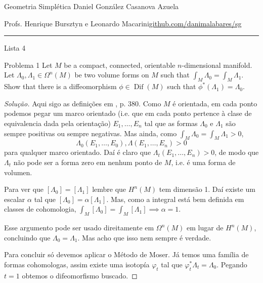 
\usepackage[style=authortitle-terse,backend=bibtex]{biblatex}




\begin{minipage}{\textwidth}
	\begin{minipage}{1\textwidth}
		Geometria Simpl\'etica \hfill Daniel González Casanova Azuela
		
		{\small Profs. Henrique Bursztyn e Leonardo Macarini\hfill\href{https://github.com/danimalabares/sg}{github.com/danimalabares/sg}}
	\end{minipage}
\end{minipage}\vspace{.2cm}\hrule

\vspace{10pt}
{\huge Lista 4}

\tableofcontents

\begin{idea4}{Problema 1}\leavevmode
Let $M$ be a compact, connected, orientable $n$-dimensional manifold. Let $\Lambda_0,\Lambda_1\in\Omega^{n}(M)$ be two volume forms on $M$ such that $\int_{M}\Lambda_0=\int_{M}\Lambda_1$. Show that there is a diffeomorphism $\phi \in \operatorname{Dif}(M)$ such that $\phi^*\left( \Lambda_1 \right) =\Lambda_0$.
\end{idea4}

\begin{proof}[Solução]
Aqui sigo as definições em \cite{lee}, p. 380.  Como $M$ é orientada, em cada ponto podemos pegar um marco orientado (i.e. que em cada ponto pertence à clase de equivalencia dada pela orientação) $E_1,\ldots,E_n$ tal que as formas $\Lambda_0$ e $\Lambda_1$ são sempre positivas ou sempre negativas. Mas ainda, como $\int_{M}\Lambda_0=\int_{M}\Lambda_1>0$,
\[\Lambda_0(E_1,\ldots,E_0),\Lambda(E_1,\ldots,E_n)>0\]
para qualquer marco orientado. Daí é claro que $\Lambda_t(E_1,\ldots,E_n)>0$, de modo que $\Lambda_t$ não pode ser a forma zero em nenhum ponto de $M$, i.e. é uma forma de volumen.

	Para ver que $\left[ \Lambda_0 \right] =\left[ \Lambda_1 \right] $ lembre que $H^{n}(M)$ tem dimensão 1. Daí existe um escalar $\alpha$ tal que $\left[ \Lambda_0 \right] =\alpha \left[ \Lambda_1 \right] $. Mas, como a integral está bem definida em classes de cohomologia, $\int_{M}\left[ \Lambda_0 \right] =\int_{M}\left[ \Lambda_1 \right] \implies \alpha=1$.

	Esse argumento pode ser usado direitamente em $\Omega^{n}(M)$ em lugar de $H^{n}(M)$, concluindo que $\Lambda_0=\Lambda_1$. Mas acho que isso nem sempre é verdade.

Para concluir só devemos aplicar o Método de Moser. Já temos uma família de formas cohomologas, assim existe uma isotopía $ \varphi_t$ tal que $\varphi^*_{t}\Lambda_t=\Lambda_0$. Pegando $t=1$ obtemos o difeomorfismo buscado.
\end{proof}

